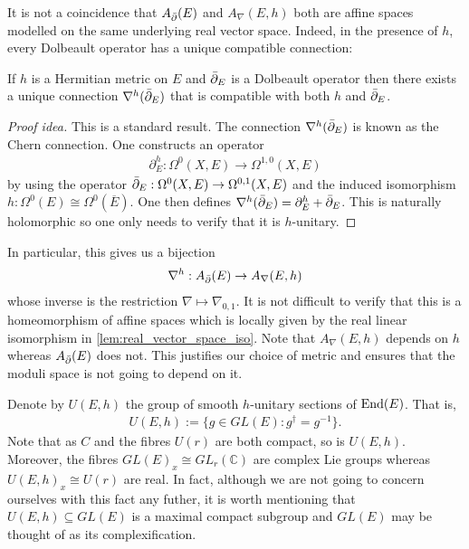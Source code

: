 \documentclass[12pt]{ociamthesis}  %
\begin{document}
It is not a coincidence that $A_{\bar{\partial}} (E)$ and $A_\nabla(E,h)$ both are
affine spaces modelled on the same underlying real vector space.
Indeed, in the presence of $h$, every Dolbeault operator has a unique
compatible connection:

\begin{theorem}\label{thm:chern_connection}
  If $h$ is a Hermitian metric on $E$ and ${\bar{\partial}}_E$ is a Dolbeault
  operator then there exists a unique connection $\nabla^h({\bar{\partial}}_E)$
  that is compatible with both $h$ and ${\bar{\partial}}_E$.
  \begin{proof}[Proof idea]
    This is a standard result.
    The connection $\nabla^h({\bar{\partial}}_E)$ is known as the Chern connection.
    One constructs an operator
    \begin{align*}
      \partial^h_E : \Omega^0(X,E) \to \Omega^{1,0}(X,E)
    \end{align*}
    by using the operator ${\bar{\partial}}_E : \Omega^0(X,E)\to \Omega^{0,1}(X,E)$
    and the induced isomorphism $h : \Omega^0(E) \cong \Omega^0(\overline E)$.
    One then defines $\nabla^h({\bar{\partial}}_E) = \partial^h_E + {\bar{\partial}}_E$.
    This is naturally holomorphic so one only needs to verify that it
    is $h$-unitary.
  \end{proof}
\end{theorem}

In particular, this gives us a bijection
\begin{align}\label{eq:chern_correspondence}
  \nabla^h : A_{\bar{\partial}} (E) \to A_\nabla(E,h)
\end{align}
whose inverse is the restriction
$\nabla \mapsto \nabla_{0,1}$. It is not difficult to verify that this
is a homeomorphism of affine spaces which is locally given by
the real linear isomorphism in \ref{lem:real_vector_space_iso}.
Note that $A_\nabla(E,h)$ depends on $h$ whereas $A_{{\bar{\partial}}}(E)$ does
not. This justifies our choice of metric and ensures that the
moduli space is not going to depend on it.

Denote by $U(E,h)$ the group of smooth $h$-unitary sections of $\operatorname{End}(E)$.
That is,
\begin{align*}
  U(E,h) := \{g \in GL(E) : g^\dagger = g^{-1}\}.
\end{align*}
Note that as $C$ and the fibres $U(r)$ are both compact,
so is $U(E,h)$. Moreover, the fibres $GL(E)_x \cong GL_r(\mathbb C)$
are complex Lie groups whereas $U(E,h)_x\cong U(r)$ are real.
In fact, although we are not going to concern ourselves with this
fact any futher, it is worth mentioning that $U(E,h)\subseteq GL(E)$
is a maximal compact subgroup and $GL(E)$ may be thought of as its
complexification.
\end{document}
